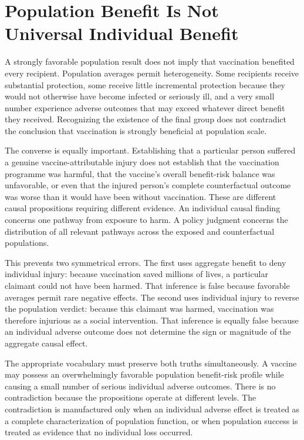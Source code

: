 \documentclass[11pt]{article}
\begin{document}
\section{Population Benefit Is Not Universal Individual Benefit}

A strongly favorable population result does not imply that vaccination benefited every recipient. Population averages permit heterogeneity. Some recipients receive substantial protection, some receive little incremental protection because they would not otherwise have become infected or seriously ill, and a very small number experience adverse outcomes that may exceed whatever direct benefit they received. Recognizing the existence of the final group does not contradict the conclusion that vaccination is strongly beneficial at population scale.

The converse is equally important. Establishing that a particular person suffered a genuine vaccine-attributable injury does not establish that the vaccination programme was harmful, that the vaccine's overall benefit-risk balance was unfavorable, or even that the injured person's complete counterfactual outcome was worse than it would have been without vaccination. These are different causal propositions requiring different evidence. An individual causal finding concerns one pathway from exposure to harm. A policy judgment concerns the distribution of all relevant pathways across the exposed and counterfactual populations.

This prevents two symmetrical errors. The first uses aggregate benefit to deny individual injury: because vaccination saved millions of lives, a particular claimant could not have been harmed. That inference is false because favorable averages permit rare negative effects. The second uses individual injury to reverse the population verdict: because this claimant was harmed, vaccination was therefore injurious as a social intervention. That inference is equally false because an individual adverse outcome does not determine the sign or magnitude of the aggregate causal effect.

The appropriate vocabulary must preserve both truths simultaneously. A vaccine may possess an overwhelmingly favorable population benefit-risk profile while causing a small number of serious individual adverse outcomes. There is no contradiction because the propositions operate at different levels. The contradiction is manufactured only when an individual adverse effect is treated as a complete characterization of population function, or when population success is treated as evidence that no individual loss occurred.
\end{document}
